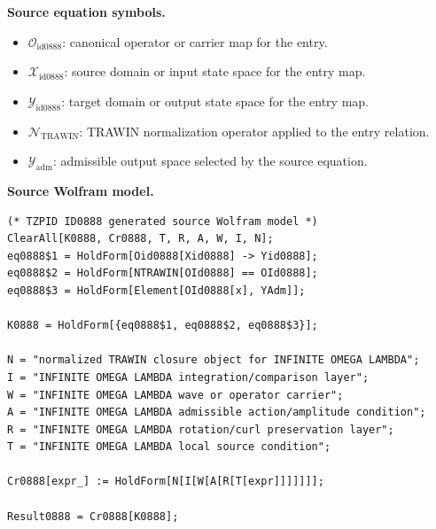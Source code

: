 \begin{minipage}[t]{0.49\linewidth}
\begingroup
\small
\raggedright
\textbf{Source equation symbols.}\par
\begin{itemize}[leftmargin=1.35em,itemsep=1pt,topsep=1pt,parsep=0pt]
    \item $\mathcal{O}_{\mathrm{id0888}}$: canonical operator or carrier map for the entry.
    \item $\mathcal{X}_{\mathrm{id0888}}$: source domain or input state space for the entry map.
    \item $\mathcal{Y}_{\mathrm{id0888}}$: target domain or output state space for the entry map.
    \item $\mathcal{N}_{\mathrm{TRAWIN}}$: TRAWIN normalization operator applied to the entry relation.
    \item $\mathcal{Y}_{\mathrm{adm}}$: admissible output space selected by the source equation.
\end{itemize}
\endgroup
\end{minipage}\hfill
\begin{minipage}[t]{0.47\linewidth}
\begingroup
\scriptsize
\raggedright
\textbf{Source Wolfram model.}\par
\begin{Verbatim}[fontsize=\tiny,breaklines=true,breakanywhere=true]
(* TZPID ID0888 generated source Wolfram model *)
ClearAll[K0888, Cr0888, T, R, A, W, I, N];
eq0888$1 = HoldForm[Oid0888[Xid0888] -> Yid0888];
eq0888$2 = HoldForm[NTRAWIN[OId0888] == OId0888];
eq0888$3 = HoldForm[Element[OId0888[x], YAdm]];

K0888 = HoldForm[{eq0888$1, eq0888$2, eq0888$3}];

N = "normalized TRAWIN closure object for INFINITE OMEGA LAMBDA";
I = "INFINITE OMEGA LAMBDA integration/comparison layer";
W = "INFINITE OMEGA LAMBDA wave or operator carrier";
A = "INFINITE OMEGA LAMBDA admissible action/amplitude condition";
R = "INFINITE OMEGA LAMBDA rotation/curl preservation layer";
T = "INFINITE OMEGA LAMBDA local source condition";

Cr0888[expr_] := HoldForm[N[I[W[A[R[T[expr]]]]]]];

Result0888 = Cr0888[K0888];
\end{Verbatim}
\endgroup
\end{minipage}

